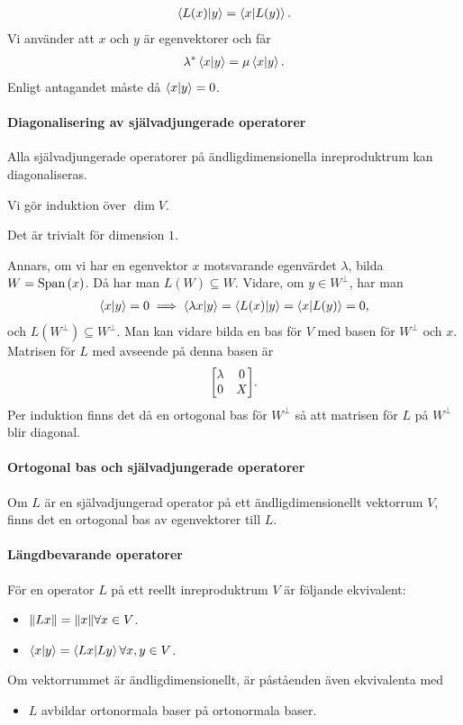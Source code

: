 \proof
\begin{align*}
	\bra{L(x)}\ket{y} = \bra{x}\ket{L(y)}.
\end{align*}
Vi använder att $x$ och $y$ är egenvektorer och får
\begin{align*}
	\lambda^{*}\bra{x}\ket{y} = \mu\bra{x}\ket{y}.
\end{align*}
Enligt antagandet måste då $\bra{x}\ket{y} = 0$.

\paragraph{Diagonalisering av självadjungerade operatorer}
Alla självadjungerade operatorer på ändligdimensionella inreproduktrum kan diagonaliseras.

\proof
Vi gör induktion över $\dim{V}$.

Det är trivialt för dimension $1$.

Annars, om vi har en egenvektor $x$ motsvarande egenvärdet $\lambda$, bilda $W = \text{Span}\left(x\right)$. Då har man $L(W)\subseteq W$. Vidare, om $y\in W^{\perp}$, har man
\begin{align*}
	\bra{x}\ket{y} = 0\implies \bra{\lambda x}\ket{y} = \bra{L(x)}\ket{y} = \bra{x}\ket{L(y)} = 0,
\end{align*}
och $L(W^{\perp})\subseteq W^{\perp}$. Man kan vidare bilda en bas för $V$ med basen för $W^{\perp}$ och $x$. Matrisen för $L$ med avseende på denna basen är
\begin{align*}
	\mqty[
		\lambda & 0 \\
		0       & X
	].
\end{align*}
Per induktion finns det då en ortogonal bas för $W^{\perp}$ så att matrisen för $L$ på $W^{\perp}$ blir diagonal.

\paragraph{Ortogonal bas och självadjungerade operatorer}
Om $L$ är en självadjungerad operator på ett ändligdimensionellt vektorrum $V$, finns det en ortogonal bas av egenvektorer till $L$.

\proof

\paragraph{Längdbevarande operatorer}
För en operator $L$ på ett reellt inreproduktrum $V$ är följande ekvivalent:
\begin{itemize}
	\item $\norm{Lx} = \norm{x}\forall x\in V$.
	\item $\bra{x}\ket{y} = \bra{Lx}\ket{Ly}\forall x, y\in V$.
\end{itemize}
Om vektorrummet är ändligdimensionellt, är påståenden även ekvivalenta med
\begin{itemize}
	\item $L$ avbildar ortonormala baser på ortonormala baser.
\end{itemize}

